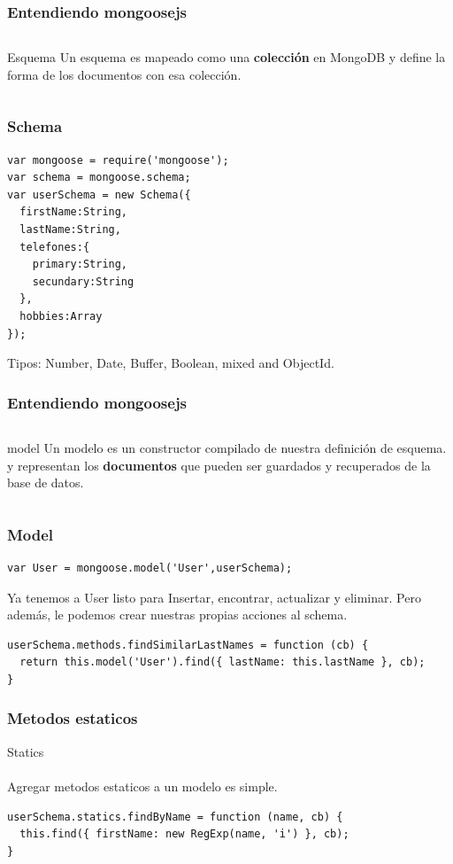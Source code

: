 \documentclass{beamer}
\begin{document}
\begin{frame}
\frametitle{Entendiendo mongoosejs}
\begin{columns}[c]
Esquema
Un esquema es mapeado como una \textbf{colecci\'on} en MongoDB y 
define la forma de los documentos  con esa colecci\'on.
\end{columns}
\end{frame}

\begin{frame}[fragile]
\frametitle{Schema}
\medskip
\begin{lstlisting}
var mongoose = require('mongoose');
var schema = mongoose.schema;
var userSchema = new Schema({
  firstName:String,
  lastName:String,
  telefones:{
    primary:String,
    secundary:String
  },
  hobbies:Array
});

\end{lstlisting}
Tipos: Number, Date, Buffer, Boolean, mixed and ObjectId.
\end{frame}

\begin{frame}
\frametitle{Entendiendo mongoosejs}
\begin{columns}[c]
model
Un modelo es un constructor compilado de nuestra definici\'on de esquema.
y representan los \textbf{documentos} que pueden ser guardados y recuperados de la base de datos.
\end{columns}
\end{frame}

\begin{frame}[fragile]
\frametitle{Model}
\medskip
\begin{lstlisting}
var User = mongoose.model('User',userSchema);
\end{lstlisting}
Ya tenemos a User listo para Insertar, encontrar, actualizar y eliminar.
Pero adem\'as, le podemos crear nuestras propias acciones al schema.

\begin{lstlisting}
userSchema.methods.findSimilarLastNames = function (cb) {
  return this.model('User').find({ lastName: this.lastName }, cb);
}
\end{lstlisting}
\end{frame}

\begin{frame}[fragile]
\frametitle{Metodos estaticos}
Statics
\\~\\
Agregar metodos estaticos a un modelo es simple.
\medskip
\begin{lstlisting}
userSchema.statics.findByName = function (name, cb) {
  this.find({ firstName: new RegExp(name, 'i') }, cb);
}
\end{lstlisting}
\end{frame}
\end{document}

